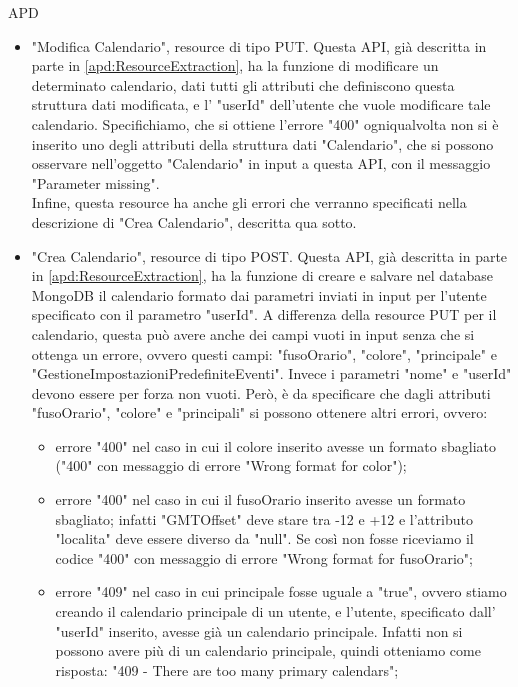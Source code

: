 \begin{listaPersonale} {APD}
\begin{listaPersonale2}[APD]{}
\begin{listaPersonale3}[APD]{}
\begin{itemize}
                \item "Modifica Calendario", resource di tipo PUT. Questa API, già descritta in parte in \ref{apd:ResourceExtraction}, ha la funzione di modificare un determinato calendario, dati tutti gli attributi che definiscono questa struttura dati modificata, e l' "userId" dell'utente che vuole modificare tale calendario. Specifichiamo, che si ottiene l'errore "400" ogniqualvolta non si è inserito uno degli attributi della struttura dati "Calendario", che si possono osservare nell'oggetto "Calendario" in input a questa API, con il messaggio "Parameter missing". \\
                      Infine, questa resource ha anche gli errori che verranno specificati nella descrizione di "Crea Calendario", descritta qua sotto.
                \item "Crea Calendario", resource di tipo POST. Questa API, già descritta in parte in \ref{apd:ResourceExtraction}, ha la funzione di creare e salvare nel database MongoDB il calendario formato dai parametri inviati in input per l'utente specificato con il parametro "userId". A differenza della resource PUT per il calendario, questa può avere anche dei campi vuoti in input senza che si ottenga un errore, ovvero questi campi: "fusoOrario", "colore", "principale" e "GestioneImpostazioniPredefiniteEventi". Invece i parametri "nome" e "userId" devono essere per forza non vuoti. Però, è da specificare che dagli attributi "fusoOrario", "colore" e "principali" si possono ottenere altri errori, ovvero:
                      \begin{itemize}
                          \item errore "400" nel caso in cui il colore inserito avesse un formato sbagliato ("400" con messaggio di errore "Wrong format for color");
                          \item errore "400" nel caso in cui il fusoOrario inserito avesse un formato sbagliato; infatti "GMTOffset" deve stare tra -12 e +12 e l'attributo "localita" deve essere diverso da "null". Se così non fosse riceviamo il codice "400" con messaggio di errore "Wrong format for fusoOrario";
                          \item errore "409" nel caso in cui principale fosse uguale a "true", ovvero stiamo creando il calendario principale di un utente, e l'utente, specificato dall' "userId" inserito, avesse già un calendario principale. Infatti non si possono avere più di un calendario principale, quindi otteniamo come risposta: "409 - There are too many primary calendars";

\end{itemize}
\end{itemize}
\end{listaPersonale3}
\end{listaPersonale2}
\end{listaPersonale}
